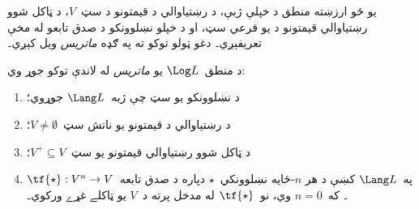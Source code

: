 \documentclass[../../../include/open-logic-section]{subfiles}
\begin{document}


يو څو ارزښته منطق د خپلې ژبې، د رښتياوالي د قيمتونو د سټ~$V$،
د ټاکل شوو رښتياوالي قيمتونو د يو فرعي سټ، او د خپلو نښلوونکو
د صدق تابعو له مخې تعريفېږي۔ دغو ټولو توکو ته په ګډه
\emph{ماتريس} ويل کېږي۔

\begin{defn}[ماتريس]
د منطق~$\Log L$ يو \emph{ماتريس} له لاندې توکو جوړ وي:
\begin{enumerate}
\item د نښلوونکو يو سټ چې ژبه~$\Lang L$ جوړوي؛
\item د رښتياوالي د قيمتونو يو ناتش سټ~$V \neq \emptyset$؛
\item د ټاکل شوو رښتياوالي قيمتونو يو سټ~$V^+ \subseteq V$؛
\item په~$\Lang L$ کښې د هر $n$-ځايه نښلوونکي~$\star$
دپاره د صدق تابعه~$\tf{\star} : V^n \to V$۔ که~$n = 0$
وي، نو~$\tf{\star}$ له مدخل پرته د~$V$ يو ټاکلے غړے ورکوي۔
\end{enumerate}
\end{defn}
\end{document}
